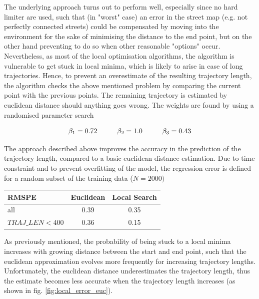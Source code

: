 \documentclass{article}
\begin{document}
\begin{multicols}{2}
The underlying approach turns out to perform well, especially since no hard limiter are used, such that (in "worst" case) an error in the street map (e.g. not perfectly connected streets) could be compensated by moving into the environment for the sake of minimising the distance to the end point, but on the other hand preventing to do so when other reasonable "options" occur. Nevertheless, as most of the local optimisation algorithms, the algorithm is vulnerable to get stuck in local minima, which is likely to arise in case of long trajectories. Hence, to prevent an overestimate of the resulting trajectory length, the algorithm checks the above mentioned problem by comparing the current point with the previous points. The remaining trajectory is estimated by euclidean distance should anything goes wrong. The weights are found by using a randomised parameter search 

$$\beta_1 = 0.72 \hspace*{1cm} \beta_2 = 1.0 \hspace*{1cm} \beta_3 = 0.43$$

The approach described above improves the accuracy in the prediction of the trajectory length, compared to a basic euclidean distance estimation. Due to time constraint and to prevent overfitting of the model, the regression error is defined for a random subset of the training data ($N = 2000)$

\begin{center}
\begin{tabular}{l||c|c}
RMSPE & Euclidean & Local Search \\
\hline\hline
all               & 0.39 & 0.35 \\
$TRAJ\_LEN < 400$ & 0.36 & 0.15 \\
\end{tabular}
\end{center}

As previously mentioned, the probability of being stuck to a local minima increases with growing distance between the start and end point, such that the euclidean approximation evolves more frequently for increasing trajectory lengths. Unfortunately, the euclidean distance underestimates the trajectory length, thus the estimate becomes less accurate when the trajectory length increases (as shown in fig. \ref{fig:local_error_euc}). 


\end{multicols}
\end{document}

